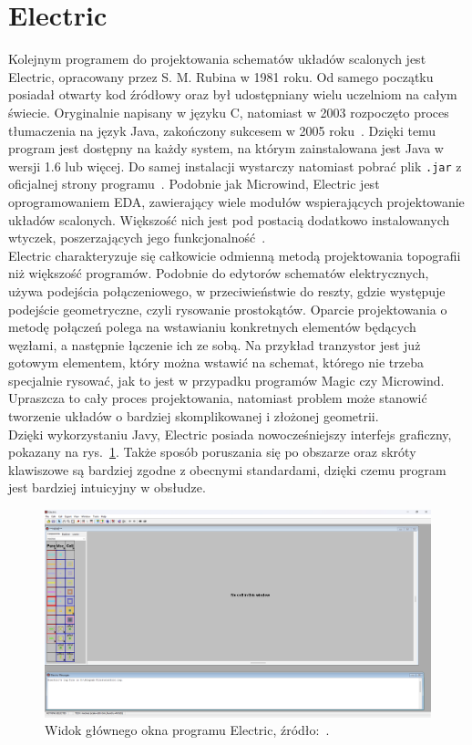 \section{Electric}

Kolejnym programem do projektowania schematów układów scalonych jest Electric,
opracowany przez S. M. Rubina w 1981 roku.
Od samego początku posiadał otwarty kod źródłowy
oraz był udostępniany wielu uczelniom na całym świecie.
Oryginalnie napisany w języku C,
natomiast w 2003 rozpoczęto proces tłumaczenia na język Java, zakończony sukcesem w 2005 roku~\cite{electric_gnu}.
Dzięki temu program jest dostępny na każdy system,
na którym zainstalowana jest Java w wersji 1.6 lub więcej.
Do samej instalacji wystarczy natomiast pobrać plik \texttt{.jar} z oficjalnej strony programu~\cite{electric_sfs}.
Podobnie jak Microwind, Electric jest oprogramowaniem EDA, zawierający wiele modułów wspierających projektowanie układów scalonych.
Większość nich jest pod postacią dodatkowo instalowanych wtyczek,
poszerzających jego funkcjonalność~\cite{electric_sfs, electric_gnu}.\\
\indent Electric charakteryzuje się całkowicie odmienną metodą projektowania topografii niż większość programów.
Podobnie do edytorów schematów elektrycznych, używa podejścia połączeniowego,
w przeciwieństwie do reszty, gdzie występuje podejście geometryczne, czyli rysowanie prostokątów.
Oparcie projektowania o metodę połączeń polega na wstawianiu konkretnych elementów będących węzłami,
a następnie łączenie ich ze sobą.
Na przykład tranzystor jest już gotowym elementem, który można wstawić na schemat,
którego nie trzeba specjalnie rysować, jak to jest w przypadku programów Magic czy Microwind.
Upraszcza to cały proces projektowania,
natomiast problem może stanowić tworzenie układów o bardziej skomplikowanej i złożonej geometrii.\\
\indent Dzięki wykorzystaniu Javy, Electric posiada nowocześniejszy interfejs graficzny,
pokazany na rys.~\ref{fig:electric_okno}.
Także sposób poruszania się po obszarze oraz skróty klawiszowe są bardziej zgodne z obecnymi standardami,
dzięki czemu program jest bardziej intuicyjny w obsłudze.

\begin{figure}[h]
    \centering
    \includegraphics[width=.9\textwidth]{chapters/chapter2/img/electric_okno}
    \caption[Widok głównego okna programu Electric.]{Widok głównego okna programu Electric, źródło:~\cite{electric_sfs}.}
    \label{fig:electric_okno}
\end{figure}


